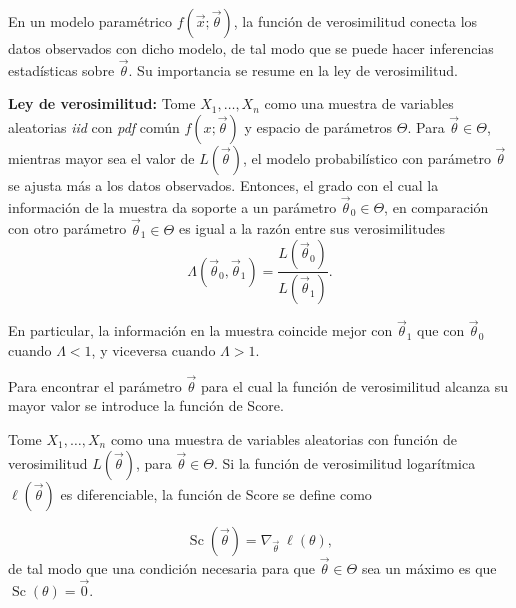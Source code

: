 		En un modelo paramétrico $f(\vec{x};\vec{\theta})$, la función de verosimilitud conecta los datos observados con dicho modelo, de tal modo que se puede hacer inferencias estadísticas sobre $\vec{\theta}$. Su importancia se resume en la ley de verosimilitud.
		
		\textbf{Ley de verosimilitud:} Tome $X_1,\dots,X_n$ como una muestra de variables aleatorias \textit{iid} con \textit{pdf} común $f(x;\vec{\theta})$ y espacio de parámetros $\Theta$. Para $\vec{\theta}\in\Theta$, mientras mayor sea el valor de $L(\vec{\theta})$, el modelo probabilístico con parámetro $\vec{\theta}$ se ajusta más a los datos observados. Entonces, el grado con el cual la información de la muestra da soporte a un parámetro $\vec{\theta}_0\in\Theta$, en comparación con otro parámetro $\vec{\theta}_1\in\Theta$ es igual a la razón entre sus verosimilitudes
		$$\Lambda(\vec{\theta}_0,\vec{\theta}_1)=\frac{L(\vec{\theta}_0)}{L(\vec{\theta}_1)}.$$
		
		En particular, la información en la muestra coincide mejor con $\vec{\theta}_1$ que con $\vec{\theta}_0$ cuando $\Lambda<1$, y viceversa cuando $\Lambda>1.$
		
		Para encontrar el parámetro $\vec{\theta}$ para el cual la función de verosimilitud alcanza su mayor valor se introduce la función de Score.
		
		\begin{defi}
			Tome $X_1,\dots,X_n$ como una muestra de variables aleatorias con función de verosimilitud $L(\vec{\theta})$, para $\vec{\theta}\in\Theta$. Si la función de verosimilitud logarítmica $\ell(\vec{\theta})$ es diferenciable, la función de Score se define como
			
			$$\mathop{Sc}(\vec{\theta})=\nabla_{\vec{\theta}}\ \ell(\theta),$$
			de tal modo que una condición necesaria para que $\vec{\theta}\in\Theta$ sea un máximo es que $\mathop{Sc}(\theta)=\vec{0}.$
		\end{defi}